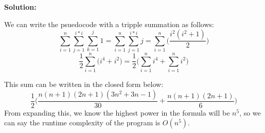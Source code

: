 \documentclass[11pt]{article}
\begin{document}
\begin{enumerate}
\begin{enumerate}
\textbf{Solution: }

We can write the psuedocode with a tripple summation as follows:
$$ \sum_{i=1}^{n} \sum_{j=1}^{i*i} \sum_{k=1}^{j} 1 = \sum_{i=1}^{n} \sum_{j=1}^{i*i} j = \sum_{i=1}^{n} \bigg( \frac{i^2(i^2+1)}{2} \bigg) $$
$$ \frac{1}{2} \sum_{i=1}^{n} \big( i^4 + i^2 \big) = \frac{1}{2} \bigg( \sum_{i=1}^{n} i^4 + \sum_{i=1}^{n} i^2 \bigg) $$

This sum can be written in the closed form below:
$$ \dfrac{1}{2} \Bigg( \dfrac{n(n+1)(2n+1)(3n^2+3n-1)}{30} + \dfrac{n(n+1)(2n+1)}{6} \Bigg) $$
From expanding this, we know the highest power in the formula will be $n^5$, so we can say the runtime complexity of the program is $O(n^5)$.  

\end{enumerate}


\end{enumerate}
\end{document}
